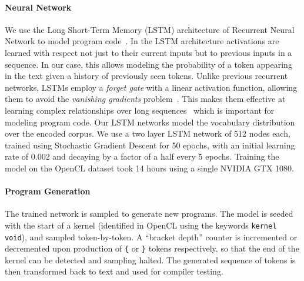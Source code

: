 \paragraph{Neural Network} We use the Long Short-Term Memory (LSTM) architecture of Recurrent Neural Network to model program code~\cite{Hochreiter1997}. In the LSTM architecture activations are learned with respect not just to their current inputs but to previous inputs in a sequence. In our case, this allows modeling the probability of a token appearing in the text given a history of previously seen tokens. Unlike previous recurrent networks, LSTMs employ a \emph{forget gate} with a linear activation function, allowing them to avoid the \emph{vanishing gradients} problem~\cite{Pacanu2013}. This makes them effective at learning complex relationships over long sequences~\cite{Lipton2015} which is important for modeling program code. Our LSTM networks model the vocabulary distribution over the encoded corpus. We use a two layer LSTM network of 512 nodes each, trained using Stochastic Gradient Descent for 50 epochs, with an initial learning rate of 0.002 and decaying by a factor of a half every 5 epochs. Training the model on the OpenCL dataset took 14 hours using a single NVIDIA GTX 1080.


\paragraph{Program Generation} The trained network is sampled to generate new programs. The model is seeded with the start of a kernel (identified in OpenCL using the keywords \texttt{kernel void}), and sampled token-by-token. A ``bracket depth'' counter is incremented or decremented upon production of \texttt{\{} or \texttt{\}} tokens respectively, so that the end of the kernel can be detected and sampling halted. The generated sequence of tokens is then transformed back to text and used for compiler testing.


